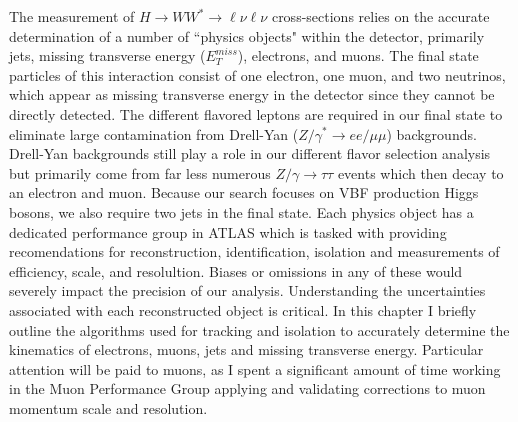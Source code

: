 The measurement of $H\rightarrow WW^*\rightarrow \ell\nu\ell\nu$ cross-sections relies on the accurate determination of a number of ``physics objects" within the detector, primarily jets, missing transverse energy ($E_T^{miss}$), electrons, and muons. The final state particles of this interaction consist of one electron, one muon, and two neutrinos, which appear as missing transverse energy in the detector since they cannot be directly detected. The different flavored leptons are required in our final state to eliminate large contamination from Drell-Yan ($Z/\gamma^*\rightarrow ee/\mu\mu$) backgrounds. Drell-Yan backgrounds still play a role in our different flavor selection analysis but primarily come from far less numerous $Z/\gamma\rightarrow\tau\tau$ events which then decay to an electron and muon. Because our search focuses on VBF production Higgs bosons, we also require two jets in the final state. Each physics object has a dedicated performance group in ATLAS which is tasked with providing recomendations for reconstruction, identification, isolation and measurements of efficiency, scale, and resolultion. Biases or omissions in any of these would severely impact the precision of our analysis. Understanding the uncertainties associated with each reconstructed object is critical. In this chapter I briefly outline the algorithms used for tracking and isolation to accurately determine the kinematics of electrons, muons, jets and missing transverse energy. Particular attention will be paid to muons, as I spent a significant amount of time working in the Muon Performance Group applying and validating corrections to muon momentum scale and resolution. 

